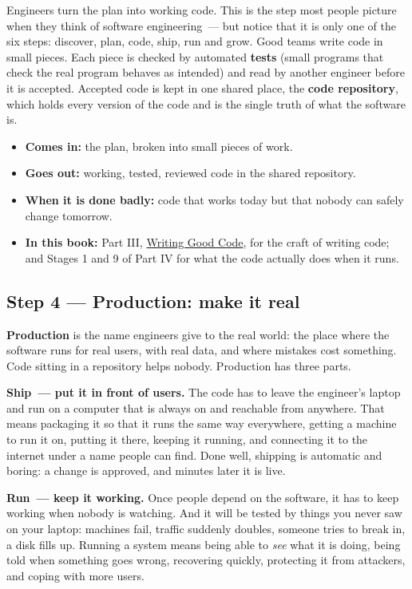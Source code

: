 Engineers turn the plan into working code. This is the step most people picture when they think of software engineering~--- but notice that it is only one of the six steps: discover, plan, code, ship, run and grow. Good teams write code in small pieces. Each piece is checked by automated \textbf{tests} (small programs that check the real program behaves as intended) and read by another engineer before it is accepted. Accepted code is kept in one shared place, the \textbf{code repository}, which holds every version of the code and is the single truth of what the software is.

\begin{itemize}
\tightlist
\item
  \textbf{Comes in:} the plan, broken into small pieces of work.
\item
  \textbf{Goes out:} working, tested, reviewed code in the shared repository.
\item
  \textbf{When it is done badly:} code that works today but that nobody can safely change tomorrow.
\item
  \textbf{In this book:} Part III, \hyperref[ch:writing-good-code]{Writing Good Code}, for the craft of writing code; and Stages 1 and 9 of Part IV for what the code actually does when it runs.
\end{itemize}

\subsection*{Step 4 --- Production: make it real}\label{how-software-gets-built:step-4--production-make-it-real}

\textbf{Production} is the name engineers give to the real world: the place where the software runs for real users, with real data, and where mistakes cost something. Code sitting in a repository helps nobody. Production has three parts.

\textbf{Ship~--- put it in front of users.} The code has to leave the engineer's laptop and run on a computer that is always on and reachable from anywhere. That means packaging it so that it runs the same way everywhere, getting a machine to run it on, putting it there, keeping it running, and connecting it to the internet under a name people can find. Done well, shipping is automatic and boring: a change is approved, and minutes later it is live.

\textbf{Run~--- keep it working.} Once people depend on the software, it has to keep working when nobody is watching. And it will be tested by things you never saw on your laptop: machines fail, traffic suddenly doubles, someone tries to break in, a disk fills up. Running a system means being able to \emph{see} what it is doing, being told when something goes wrong, recovering quickly, protecting it from attackers, and coping with more users.

